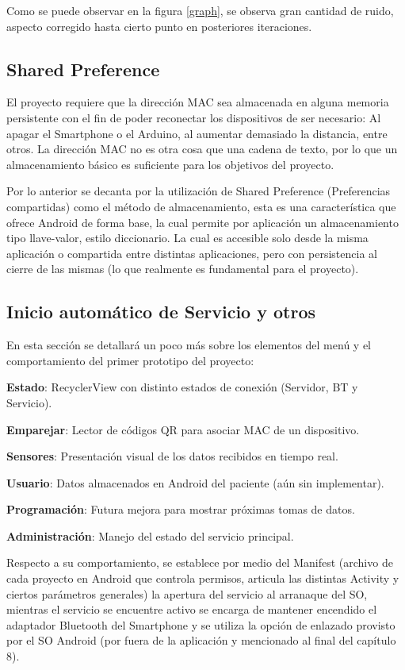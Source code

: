 Como se puede observar en la figura \ref{graph}, se observa gran cantidad de ruido, aspecto corregido hasta cierto punto en posteriores iteraciones.

\subsection{Shared Preference}

El proyecto requiere que la dirección MAC sea almacenada en alguna memoria persistente con el fin de poder reconectar los dispositivos de ser necesario: Al apagar el Smartphone o el Arduino, al aumentar demasiado la distancia, entre otros. La dirección MAC no es otra cosa que una cadena de texto, por lo que un almacenamiento básico es suficiente para los objetivos del proyecto.

Por lo anterior se decanta por la utilización de Shared Preference (Preferencias compartidas) como el método de almacenamiento, esta es una característica que ofrece Android de forma base, la cual permite por aplicación un almacenamiento tipo llave-valor, estilo diccionario. La cual es accesible solo desde la misma aplicación o compartida entre distintas aplicaciones, pero con persistencia al cierre de las mismas (lo que realmente es fundamental para el proyecto).

\subsection{Inicio automático de Servicio y otros}

En esta sección se detallará un poco más sobre los elementos del menú y el  comportamiento del primer prototipo del proyecto:

\textbf{Estado}: RecyclerView con distinto estados de conexión (Servidor, BT y Servicio).

\textbf{Emparejar}: Lector de códigos QR para asociar MAC de un dispositivo.

\textbf{Sensores}: Presentación visual de los datos recibidos en tiempo real.

\textbf{Usuario}: Datos almacenados en Android del paciente (aún sin implementar).

\textbf{Programación}: Futura mejora para mostrar próximas tomas de datos.

\textbf{Administración}: Manejo del estado del servicio principal.

Respecto a su comportamiento, se establece por medio del Manifest (archivo de cada proyecto en Android que controla permisos, articula las distintas Activity y ciertos parámetros generales) la apertura del servicio al arranaque del SO, mientras el servicio se encuentre activo se encarga de mantener encendido el adaptador Bluetooth del Smartphone y se utiliza la opción de enlazado provisto por el SO Android (por fuera de la aplicación y mencionado al final del capítulo 8).
 


